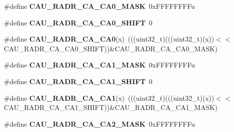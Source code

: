 \begin{DoxyCompactItemize}
\item 
\#define {\bfseries C\+A\+U\+\_\+\+R\+A\+D\+R\+\_\+\+C\+A\+\_\+\+C\+A0\+\_\+\+M\+A\+SK}~0x\+F\+F\+F\+F\+F\+F\+F\+Fu\hypertarget{group__CAU__Register__Masks_ga8839d1ade5765c2f41d1e4666bb039ef}{}\label{group__CAU__Register__Masks_ga8839d1ade5765c2f41d1e4666bb039ef}

\item 
\#define {\bfseries C\+A\+U\+\_\+\+R\+A\+D\+R\+\_\+\+C\+A\+\_\+\+C\+A0\+\_\+\+S\+H\+I\+FT}~0\hypertarget{group__CAU__Register__Masks_ga56a6980d68ebf41b5b321ed2a9211c1e}{}\label{group__CAU__Register__Masks_ga56a6980d68ebf41b5b321ed2a9211c1e}

\item 
\#define {\bfseries C\+A\+U\+\_\+\+R\+A\+D\+R\+\_\+\+C\+A\+\_\+\+C\+A0}(x)~(((uint32\+\_\+t)(((uint32\+\_\+t)(x))$<$$<$C\+A\+U\+\_\+\+R\+A\+D\+R\+\_\+\+C\+A\+\_\+\+C\+A0\+\_\+\+S\+H\+I\+FT))\&C\+A\+U\+\_\+\+R\+A\+D\+R\+\_\+\+C\+A\+\_\+\+C\+A0\+\_\+\+M\+A\+SK)\hypertarget{group__CAU__Register__Masks_gaf2bb47dc97be73cd0c2862fe138900ec}{}\label{group__CAU__Register__Masks_gaf2bb47dc97be73cd0c2862fe138900ec}

\item 
\#define {\bfseries C\+A\+U\+\_\+\+R\+A\+D\+R\+\_\+\+C\+A\+\_\+\+C\+A1\+\_\+\+M\+A\+SK}~0x\+F\+F\+F\+F\+F\+F\+F\+Fu\hypertarget{group__CAU__Register__Masks_ga7d2e754db6dd6dae2933a852f15a6f60}{}\label{group__CAU__Register__Masks_ga7d2e754db6dd6dae2933a852f15a6f60}

\item 
\#define {\bfseries C\+A\+U\+\_\+\+R\+A\+D\+R\+\_\+\+C\+A\+\_\+\+C\+A1\+\_\+\+S\+H\+I\+FT}~0\hypertarget{group__CAU__Register__Masks_ga1a0bd671ac27226fa5dd3c491a5f74c4}{}\label{group__CAU__Register__Masks_ga1a0bd671ac27226fa5dd3c491a5f74c4}

\item 
\#define {\bfseries C\+A\+U\+\_\+\+R\+A\+D\+R\+\_\+\+C\+A\+\_\+\+C\+A1}(x)~(((uint32\+\_\+t)(((uint32\+\_\+t)(x))$<$$<$C\+A\+U\+\_\+\+R\+A\+D\+R\+\_\+\+C\+A\+\_\+\+C\+A1\+\_\+\+S\+H\+I\+FT))\&C\+A\+U\+\_\+\+R\+A\+D\+R\+\_\+\+C\+A\+\_\+\+C\+A1\+\_\+\+M\+A\+SK)\hypertarget{group__CAU__Register__Masks_ga595e87363fbdaccc16d6c649b1895e6b}{}\label{group__CAU__Register__Masks_ga595e87363fbdaccc16d6c649b1895e6b}

\item 
\#define {\bfseries C\+A\+U\+\_\+\+R\+A\+D\+R\+\_\+\+C\+A\+\_\+\+C\+A2\+\_\+\+M\+A\+SK}~0x\+F\+F\+F\+F\+F\+F\+F\+Fu\hypertarget{group__CAU__Register__Masks_ga7fa186d5e73cc29fa76adb228433030e}{}\label{group__CAU__Register__Masks_ga7fa186d5e73cc29fa76adb228433030e}


\end{DoxyCompactItemize}
